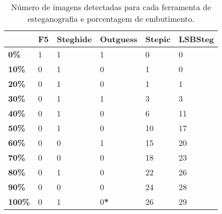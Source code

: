 \begin{table}[!ht]
  \begin{center}
    \begin{tabular}{|l|l|l|l|l|l|}
      \hline
& \textbf{F5} & \textbf{Steghide} & \textbf{Outguess} & \textbf{Stepic} & \textbf{LSBSteg} \\ \hline
\textbf{0\%} & 1 & 1 & 1 & 0 & 0 \\ \hline
\textbf{10\%} & 0 & 1 & 0 & 1 & 0 \\ \hline
\textbf{20\%} & 0 & 1 & 0 & 1 & 1 \\ \hline
\textbf{30\%} & 0 & 1 & 1 & 3 & 3 \\ \hline
\textbf{40\%} & 0 & 1 & 0 & 6 & 11 \\ \hline
\textbf{50\%} & 0 & 1 & 0 & 10 & 17 \\ \hline
\textbf{60\%} & 0 & 0 & 1 & 15 & 20 \\ \hline
\textbf{70\%} & 0 & 0 & 0 & 18 & 23 \\ \hline
\textbf{80\%} & 0 & 1 & 0 & 22 & 26 \\ \hline
\textbf{90\%} & 0 & 0 & 0 & 24 & 28 \\ \hline
\textbf{100\%} & 0 & 1 & 0\textbf{*} & 26 & 29 \\ \hline
    \end{tabular}
  \end{center}
  \caption{Número de imagens detectadas para cada ferramenta de esteganografia e porcentagem de embutimento.}
  \label{tab:summary}
\end{table}
